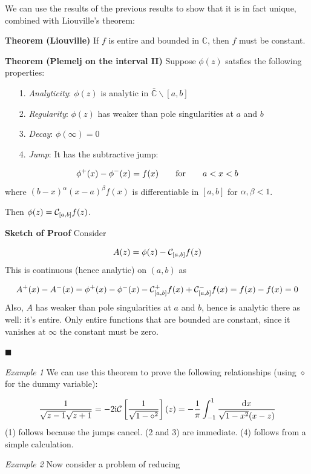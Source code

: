 \documentclass[12pt,a4paper]{article}
\def\qqfor{\qquad\hbox{for}\qquad}
\def\D{ {\rm d} }
\def\I{ {\rm i} }
\def\C{ {\mathbb C} }
\def\qqfor{\qquad\hbox{for}\qquad}
\def\dx{\D x}
\begin{document}
We can use the results of the previous results to show that it is in fact unique, combined with Liouville's theorem:

\textbf{Theorem (Liouville)} If $f$ is entire and  bounded in ${\mathbb C}$, then $f$ must be constant.

\textbf{Theorem (Plemelj on the interval II)} Suppose $\phi(z)$ satsfies the following properties:

\begin{itemize}
\item[1. ] \emph{Analyticity}: $\phi(z)$ is analytic in $\bar \C \backslash [a,b]$


\item[2. ] \emph{Regularity}: $\phi(z)$ has weaker than pole singularities at $a$ and $b$


\item[3. ] \emph{Decay}: $\phi(\infty) = 0$


\item[4. ] \emph{Jump}: It has the subtractive jump:

\end{itemize}
\[
\phi^+(x) - \phi^-(x) = f(x) \qqfor a < x < b
\]
where $(b-x)^\alpha (x-a)^\beta f(x)$ is differentiable in $[a,b]$ for $\alpha,\beta < 1$.  

Then $\phi(z) = {\cal C}_{[a,b]} f(z)$.

\textbf{Sketch of Proof} Consider 

\[
A(z) = \phi(z) - {\cal C}_{[a,b]} f(z)
\]
This is continuous (hence analytic) on $(a,b)$ as

\[
A^+(x) - A^-(x) = \phi^+(x) -\phi^-(x) - {\cal C}_{[a,b]}^+ f(x) + {\cal C}_{[a,b]}^- f(x)  =f(x) - f(x) = 0
\]
Also, $A$ has weaker than pole singularities at $a$ and $b$, hence is analytic there as well: it's entire.  Only entire functions that are bounded are constant, since it vanishes at $\infty$ the constant must be zero.

\ensuremath{\blacksquare}

\emph{Example 1} We can use this theorem to prove the following relationships  (using $\diamond$ for the dummy variable):

\[
{1 \over \sqrt{z-1} \sqrt{z+1}} = -2 \I {\cal C}\left[{1 \over \sqrt{1-\diamond^2}}\right](z) = 
-{1 \over \pi}\int_{-1}^1 {\dx \over \sqrt{1-x^2} (x-z)}
\]
(1) follows because the jumps cancel. (2 and 3) are immediate. (4) follows from a simple calculation. 

\emph{Example 2} Now consider a problem of reducing 
\end{document}
